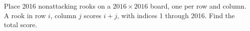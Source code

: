 Place 2016 nonattacking rooks on a $ 2016\times2016 $ board, one per row and column. A rook in row $ i $, column $ j $ scores $ i+j $, with indices 1 through 2016. Find the total score.

